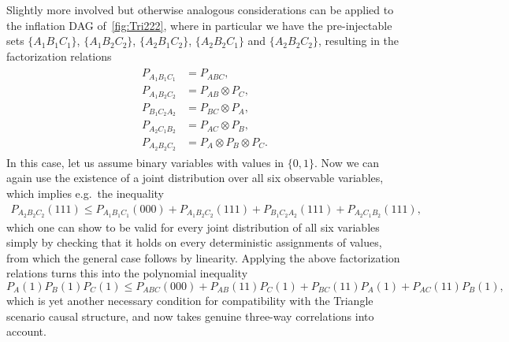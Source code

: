 Slightly more involved but otherwise analogous considerations can be applied to the inflation DAG of~\cref{fig:Tri222}, where in particular we have the pre-injectable sets $\{A_1 B_1 C_1\}$, $\{A_1 B_2 C_2\}$, $\{A_2 B_1 C_2\}$, $\{A_2 B_2 C_1\}$ and $\{A_2 B_2 C_2\}$, resulting in the factorization relations
\begin{align}\begin{split}\label{eq:tri222fac}
	P_{A_1 B_1 C_1} &= P_{A B C}, \\
	P_{A_1 B_2 C_2} &= P_{A B} \otimes P_{C}, \\
	P_{B_1 C_2 A_2} &= P_{B C} \otimes P_{A}, \\
	P_{A_2 C_1 B_2} &= P_{A C} \otimes P_{B}, \\
	P_{A_2 B_2 C_2} &= P_{A} \otimes P_{B} \otimes P_{C} .
\end{split}\end{align}
In this case, let us assume binary variables with values in $\{0,1\}$. Now we can again use the existence of a joint distribution over all six observable variables, which implies e.g.~the inequality
\begin{align}\label{eq:FritzF3raw}
	P_{A_2 B_2 C_2}(111) \leq P_{A_1 B_1 C_1}(000) + P_{A_1 B_2 C_2}(111) + P_{B_1 C_2 A_2}(111) + P_{A_2  C_1 B_2}(111),
\end{align}
which one can show to be valid for every joint distribution of all six variables simply by checking that it holds on every deterministic assignments of values, from which the general case follows by linearity. Applying the above factorization relations turns this into the polynomial inequality
\begin{equation}\label{eq:FritzF3}
	P_{A}(1) P_{B}(1) P_{C}(1) \leq P_{ABC}(000) + P_{AB}(11) P_C(1) + P_{BC}(11) P_A(1) + P_{AC}(11) P_B(1),
\end{equation}
which is yet another necessary condition for compatibility with the Triangle scenario causal structure, and now takes genuine three-way correlations into account. 
